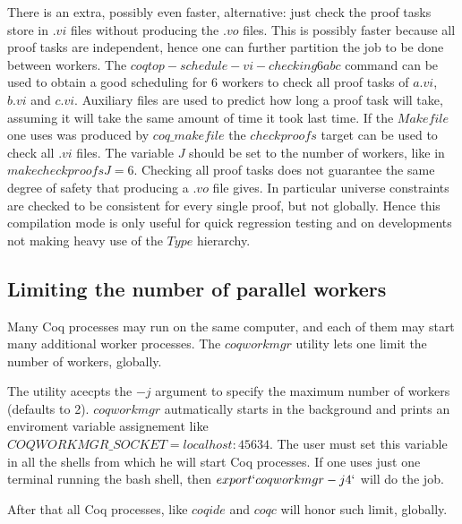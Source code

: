 There is an extra, possibly even faster, alternative: just check
the proof tasks store in $.vi$ files without producing the $.vo$ files.
This is possibly faster because all proof tasks are independent, hence
one can further partition the job to be done between workers.
The $coqtop -schedule-vi-checking 6 a b c$ command can be used to obtain
a good scheduling for 6 workers to check all proof tasks of $a.vi$, $b.vi$ and
$c.vi$.  Auxiliary files are used to predict how long a proof task will take,
assuming it will take the same amount of time it took last time.
If the $Makefile$ one uses was produced by $coq\_makefile$ the $checkproofs$
target can be used to check all $.vi$ files.  The variable $J$ should be
set to the number of workers, like in $make checkproofs J=6$.
Checking all proof tasks does not guarantee the same degree of safety
that producing a $.vo$ file gives.  In particular universe constraints
are checked to be consistent for every single proof, but not globally.
Hence this compilation mode is only useful for quick regression testing
and on developments not making heavy use of the $Type$ hierarchy.

\subsection{Limiting the number of parallel workers}
\label{coqworkmgr}

Many Coq processes may run on the same computer, and each of them may start
many additional worker processes. 
The $coqworkmgr$ utility lets one limit the number of workers, globally.

The utility acecpts the $-j$ argument to specify the maximum number of
workers (defaults to 2).  $coqworkmgr$ autmatically starts in the
background and prints an enviroment variable assignement like
$COQWORKMGR\_SOCKET=localhost:45634$.  The user must set this variable in
all the shells from which he will start Coq processes.  If one uses just
one terminal running the bash shell, then $export `coqworkmgr -j 4`$ will
do the job.

After that all Coq processes, like $coqide$ and $coqc$ will honor such
limit, globally.


